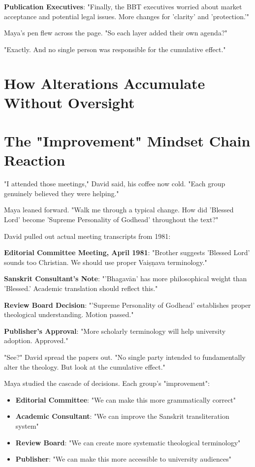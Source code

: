 \documentclass[11pt,twoside]{book}
\begin{document}
\textbf{\textbf{Publication Executives}}: "Finally, the BBT executives worried about market acceptance and potential legal issues. More changes for 'clarity' and 'protection.'"

Maya's pen flew across the page. "So each layer added their own agenda?"

"Exactly. And no single person was responsible for the cumulative effect."
\section*{How Alterations Accumulate Without Oversight}
\label{sec:orgb56afd1}

\section*{The "Improvement" Mindset Chain Reaction}
\label{sec:orgb7a4db5}

"I attended those meetings," David said, his coffee now cold. "Each group genuinely believed they were helping."

Maya leaned forward. "Walk me through a typical change. How did 'Blessed Lord' become 'Supreme Personality of Godhead' throughout the text?"

David pulled out actual meeting transcripts from 1981:

\textbf{\textbf{Editorial Committee Meeting, April 1981}}: "Brother suggests 'Blessed Lord' sounds too Christian. We should use proper Vaiṣṇava terminology."

\textbf{\textbf{Sanskrit Consultant's Note}}: "'Bhagavān' has more philosophical weight than 'Blessed.' Academic translation should reflect this."

\textbf{\textbf{Review Board Decision}}: "'Supreme Personality of Godhead' establishes proper theological understanding. Motion passed."

\textbf{\textbf{Publisher's Approval}}: "More scholarly terminology will help university adoption. Approved."

"See?" David spread the papers out. "No single party intended to fundamentally alter the theology. But look at the cumulative effect."

Maya studied the cascade of decisions. Each group's "improvement":
\begin{itemize}
\item \textbf{\textbf{Editorial Committee}}: "We can make this more grammatically correct"
\item \textbf{\textbf{Academic Consultant}}: "We can improve the Sanskrit transliteration system"
\item \textbf{\textbf{Review Board}}: "We can create more systematic theological terminology"
\item \textbf{\textbf{Publisher}}: "We can make this more accessible to university audiences"
\end{itemize}
\end{document}
